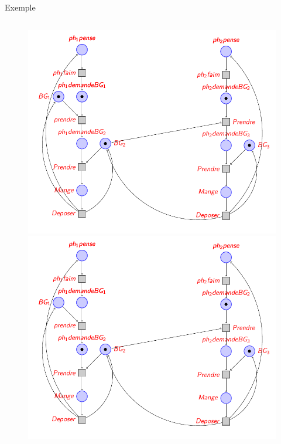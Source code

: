 \begin{frame}{Exemple}
\begin{columns}
\begin{column}{0.4\textwidth}
\begin{figure}
{				}
				\only<3-3>
				{
					\includegraphics[width=\linewidth]{resources/testpetri3}
				}
				\only<4-4>
				{
					\includegraphics[width=\linewidth]{resources/testpetri4}
				}
				\only<5-5>
				{
}
\end{figure}
\end{column}
\end{columns}
\end{frame}
